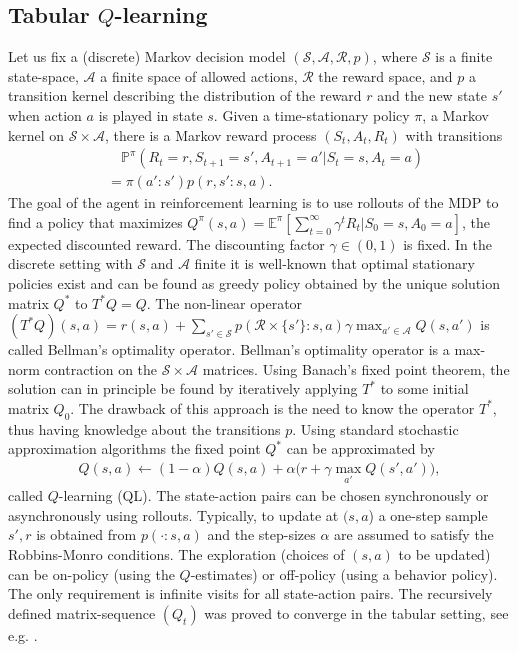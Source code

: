\documentclass{article}
\theoremstyle{plain}
\theoremstyle{definition}
\theoremstyle{remark}
\begin{document}
\subsection{Tabular $Q$-learning}
Let us fix a (discrete) Markov decision model $(\mathcal S,\mathcal A,\mathcal R,p)$, where $\mathcal S$ is a finite state-space, $\mathcal A$ a finite space of allowed actions, $\mathcal R$ the reward space, and $p$ a transition kernel describing the distribution of the reward $r$ and the new state $s'$ when action $a$ is played in state $s$. Given a time-stationary policy $\pi$, a Markov kernel on $\mathcal S\times \mathcal A$, there is a Markov reward process $(S_t,A_t,R_t)$ with transitions 
\begin{align*}
    &\quad \mathbb P^\pi(R_t=r, S_{t+1}=s', A_{t+1}=a'|S_t=s, A_t=a)\\
&=\pi(a'\colon s')p(r,s'\colon s,a).
\end{align*}
The goal of the agent in reinforcement learning is to use  rollouts of the MDP to find a policy that maximizes $Q^\pi(s,a)=\mathbb E^\pi[\sum_{t=0}^\infty \gamma^t R_t|S_0=s,A_0=a]$, the expected discounted reward. The discounting factor $\gamma\in (0,1)$ is fixed. In the discrete setting with $\mathcal S$ and $\mathcal A$ finite it is well-known that optimal stationary policies exist and can be found as greedy policy obtained by the unique solution matrix $Q^*$ to $T^*Q=Q$. The non-linear operator $(T^* Q)(s,a)= r(s,a)+\sum_{s'\in \mathcal S}p(\mathcal R\times \{s'\}:s,a) \gamma\max_{a'\in \mathcal A} Q(s,a')$ is called Bellman's optimality operator. Bellman's optimality operator is a max-norm contraction on the $\mathcal S\times \mathcal A$ matrices. Using Banach's fixed point theorem, the solution can in principle be found by iteratively applying $T^*$ to some initial matrix $Q_0$. The drawback of this approach is the need to know the operator $T^*$, thus having knowledge about the transitions $p$. Using standard stochastic approximation algorithms the fixed point $Q^*$ can be approximated by 
\begin{align*}
     Q(s,a)
    \leftarrow (1-\alpha)Q(s,a)+\alpha\big(r+\gamma \max_{a'}Q(s',a')\big),
\end{align*}
called $Q$-learning (QL). The state-action pairs can be chosen synchronously or asynchronously using rollouts. Typically, to update at $(s,a$) a one-step sample $s',r$ is obtained from $p(\cdot: s,a)$ and the step-sizes $\alpha$ are assumed to satisfy the Robbins-Monro conditions. The exploration (choices of $(s,a)$ to be updated) can be on-policy (using the $Q$-estimates) or off-policy (using a behavior policy). The only requirement is infinite visits for all state-action pairs. The recursively defined matrix-sequence $(Q_t)$ was proved to converge in the tabular setting, see e.g. \cite{Tsitsiklis1994}.
\end{document}
